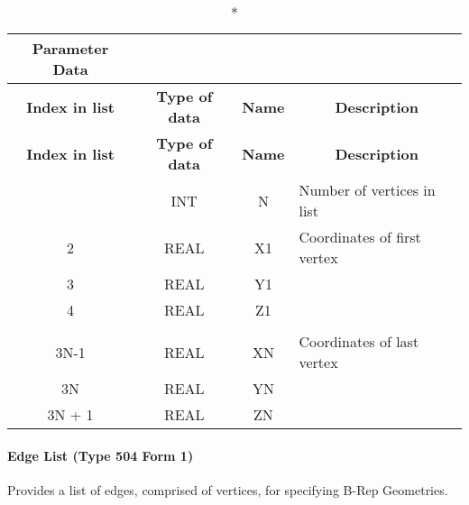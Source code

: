 \begin{longtable}[H]{|c|c|c|l|}
  \caption*{Parameter Data} \\

  \hline
  \multicolumn{1}{|c|}{\textbf{Index in list}} & \multicolumn{1}{|c|}{\textbf{Type of data}} &
  \multicolumn{1}{|c|}{\textbf{Name}} & \multicolumn{1}{|c|}{\textbf{Description}} \\ \hline
  \endfirsthead
  \hline
  
  \multicolumn{1}{|c|}{\textbf{Index in list}} & \multicolumn{1}{|c|}{\textbf{Type of data}} &
  \multicolumn{1}{|c|}{\textbf{Name}} & \multicolumn{1}{|c|}{\textbf{Description}} \\ \hline
  \endhead
  
  \endfoot

  \endlastfoot
1 & INT & N & Number of vertices in list\\ \hline
2 & REAL & X1 & Coordinates of first vertex\\ \hline
3 & REAL & Y1 &\\ \hline
4 & REAL & Z1 &\\ \hline
\vtop{\hbox{\strut .}\hbox{\strut .}} &
\vtop{\hbox{\strut .}\hbox{\strut .}} &
\vtop{\hbox{\strut .}\hbox{\strut .}} &\\ \hline
3N-1 & REAL & XN & Coordinates of last vertex\\ \hline
3N & REAL & YN &\\ \hline
3N + 1 & REAL & ZN &\\ \hline
\end{longtable}

\paragraph{Edge List (Type 504 Form 1)}\label{edge-list-type-504-form-1}

Provides a list of edges, comprised of vertices, for specifying B-Rep
Geometries.

